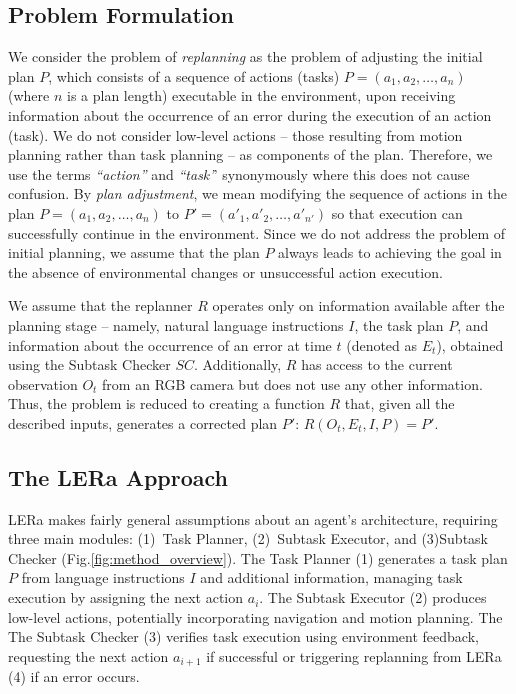\documentclass[letterpaper, 10 pt, conference]{ieeeconf}  %
\begin{document}
\subsection{Problem Formulation}
\label{subsec:problem}
We consider the problem of \textit{replanning} as the problem of adjusting the initial plan $P$, which consists of a sequence of actions (tasks) $P=(a_1, a_2, \dots, a_n)$ (where $n$ is a plan length) executable in the environment, upon receiving information about the occurrence of an error during the execution of an action (task). We do not consider low-level actions -- those resulting from motion planning rather than task planning -- as components of the plan. Therefore, we use the terms \textit{``action''} and \textit{``task'}' synonymously where this does not cause confusion.
By \textit{plan adjustment}, we mean modifying the sequence of actions in the plan $P=(a_1, a_2, \dots, a_n)$ to $P'=(a'_1, a'_2, \dots, a'_{n'})$ so that execution can successfully continue in the environment. Since we do not address the problem of initial planning, we assume that the plan $P$ always leads to achieving the goal in the absence of environmental changes or unsuccessful action execution.

We assume that the replanner $R$ operates only on information available after the planning stage -- namely, natural language instructions $I$, the task plan $P$, and information about the occurrence of an error at time $t$ (denoted as $E_t$), obtained using the Subtask Checker $SC$. Additionally, $R$ has access to the current observation $O_t$ from an RGB camera but does not use any other information.
Thus, the problem is reduced to creating a function $R$ that, given all the described inputs, generates a corrected plan $P'$: $R(O_t, E_t, I, P) = P'$.

\subsection{The LERa Approach}
\label{subsec:lera}
LERa makes fairly general assumptions about an agent's architecture, requiring three main modules: (1)~Task Planner, (2)~Subtask Executor, and (3)Subtask Checker (Fig.\ref{fig:method_overview}).
The Task Planner (1) generates a task plan $P$ from language instructions $I$ and additional information, managing task execution by assigning the next action $a_i$.  The Subtask Executor (2) produces low-level actions, potentially incorporating navigation and motion planning. The The Subtask Checker (3) verifies task execution using environment feedback, requesting the next action $a_{i+1}$ if successful or triggering replanning from LERa (4) if an error occurs.
\end{document}

